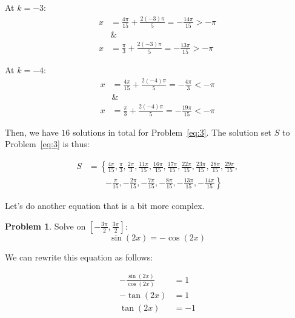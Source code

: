 \documentclass[12pt]{article}
\theoremstyle{definition}
\newtheorem{problem}{Problem}
\begin{document}
At $k=-3$:
\begin{align}
    x         & =\frac{4\pi}{15} + \frac{2(-3)\pi}{5} = -\frac{14\pi}{15} > -\pi \\
    \nonumber & \&                                                               \\
    x         & =\frac{\pi}{3} + \frac{2(-3)\pi}{5} = -\frac{13\pi}{15} > -\pi
\end{align}

At $k=-4$:
\begin{align}
    x         & =\frac{4\pi}{15} + \frac{2(-4)\pi}{5} = -\frac{4\pi}{3} < -\pi \\
    \nonumber & \&                                                             \\
    x         & =\frac{\pi}{3} + \frac{2(-4)\pi}{5} = -\frac{19\pi}{15} < -\pi
\end{align}

Then, we have $16$ solutions in total for Problem~\eqref{eq:3}.
The solution set $S$ to Problem~\eqref{eq:3} is thus:

\begin{equation}
    \begin{aligned}
        S & = \left\{ \frac{4\pi}{15}, \frac{\pi}{3}, \frac{2\pi}{3}, \frac{11\pi}{15}, \frac{16\pi}{15}, \frac{17\pi}{15}, \frac{22\pi}{15}, \frac{23\pi}{15}, \frac{28\pi}{15}, \frac{29\pi}{15}, \right. \\
          & \qquad \left. -\frac{\pi}{15}, -\frac{2\pi}{15}, -\frac{7\pi}{15}, -\frac{8\pi}{15}, -\frac{13\pi}{15}, -\frac{14\pi}{15} \right\}
    \end{aligned}
\end{equation}

Let's do another equation that is a bit more complex.

\begin{problem}
Solve on $\displaystyle \left[-\frac{3\pi}{2}, \frac{3\pi}{2}\right]$:
\begin{equation*}
    \sin(2x) = -\cos(2x) \label{eq:4}
\end{equation*}
\end{problem}

We can rewrite this equation as follows:

\begin{align}
    -\frac{\sin(2x)}{\cos(2x)} & = 1  \\
    -\tan(2x)                  & = 1  \\
    \tan(2x)                   & = -1
\end{align}
\end{document}
